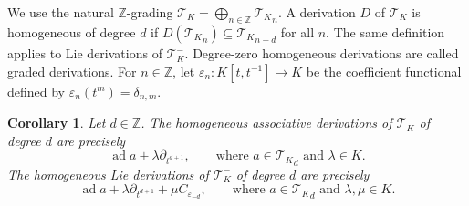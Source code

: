 \documentclass[11pt]{article}
\numberwithin{equation}{section}
\theoremstyle{plain}
\newtheorem{corollary}[theorem]{Corollary}
\theoremstyle{definition}
\numberwithin{equation}{section}
\newcommand{\T}{\mathscr T_K}
\begin{document}
We use the natural $\mathbb Z$-grading $\T=\bigoplus_{n\in\mathbb Z}{\T}_n$. A derivation $D$ of $\T$ is homogeneous of degree $d$ if $D({\T}_n)\subseteq{\T}_{n+d}$ for all $n$. The same definition applies to Lie derivations of $\T^-$. Degree-zero homogeneous derivations are called graded derivations. For $n\in\mathbb Z$, let $\varepsilon_n:K[t,t^{-1}]\to K$ be the coefficient functional defined by $\varepsilon_n(t^m)=\delta_{n,m}$.

\begin{corollary}\label{cor:homogeneous-derivations}
Let $d\in\mathbb Z$. The homogeneous associative derivations of $\T$ of degree $d$ are precisely
$$
\operatorname{ad}a+\lambda\partial_{t^{d+1}},
\qquad\text{where } a\in{\T}_d \text{ and }\lambda\in K.
$$
The homogeneous Lie derivations of $\T^-$ of degree $d$ are precisely
$$
\operatorname{ad}a+\lambda\partial_{t^{d+1}}+\mu C_{\varepsilon_{-d}},
\qquad\text{where }a\in{\T}_d\text{ and }\lambda,\mu\in K.
$$
\end{corollary}
\end{document}
